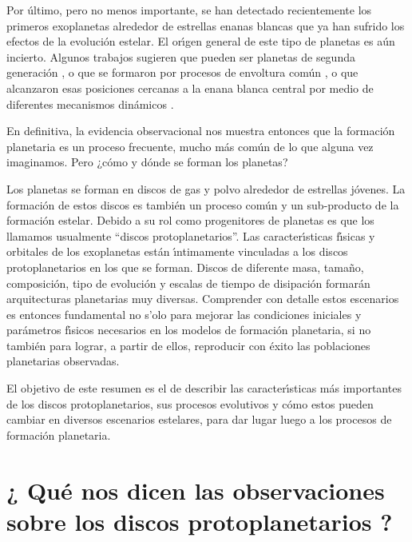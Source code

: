 \documentclass[baaa]{baaa}
\begin{document}
Por último, pero no menos importante, se han detectado recientemente los primeros exoplanetas alrededor de estrellas enanas blancas \citep{Gansicke2019,Vandenburg2020,Blackman2021} que ya han sufrido los efectos de la evoluci\'on estelar. El or\'{\i}gen general de este tipo de planetas es a\'un incierto. Algunos trabajos sugieren que pueden ser planetas de segunda generaci\'on \citep{BearSoker2015}, o que se formaron por procesos de envoltura com\'un \citep{Lagos2021}, o que alcanzaron esas posiciones cercanas a la enana blanca central por medio de diferentes mecanismos din\'amicos \citep[ver][y las referencias all\'{\i} mencionadas]{Veras2021Rev}. 

En definitiva, la evidencia observacional nos muestra entonces que la formaci\'on planetaria es un proceso frecuente, mucho m\'as com\'un de lo que alguna vez imaginamos. Pero ¿c\'omo y d\'onde se forman los planetas?

Los planetas se forman en discos de gas y polvo alrededor de estrellas j\'ovenes. La formaci\'on de estos discos es tambi\'en un proceso com\'un y un sub-producto de la formaci\'on estelar. Debido a su rol como progenitores de planetas es que los llamamos usualmente ``discos protoplanetarios''. Las caracter\'{\i}sticas f\'{\i}sicas y orbitales de los exoplanetas est\'an \'{\i}ntimamente vinculadas a los discos protoplanetarios en los que se forman. Discos de diferente masa, tama\~no, composici\'on, tipo de evoluci\'on y escalas de tiempo de disipaci\'on formar\'an arquitecturas planetarias muy diversas. Comprender con detalle estos escenarios es entonces fundamental no s'olo para mejorar las condiciones iniciales y parámetros f\'{\i}sicos necesarios en los modelos de formaci\'on planetaria, si no tambi\'en para lograr, a partir de ellos, reproducir con \'exito las poblaciones planetarias observadas.

El objetivo de este resumen es el de describir las caracter\'{\i}sticas m\'as importantes de los discos protoplanetarios, sus procesos evolutivos y c\'omo estos pueden cambiar en diversos escenarios estelares, para dar lugar luego a los procesos de formaci\'on planetaria.

\section{¿ Qu\'e nos dicen las observaciones sobre los discos protoplanetarios ?}\label{S_intro}
\end{document}
